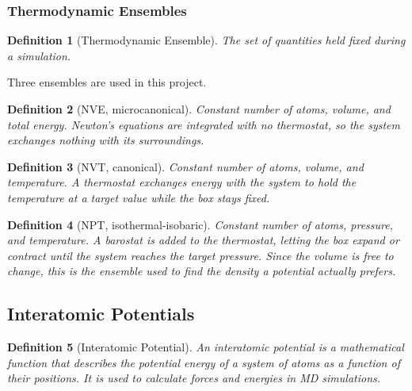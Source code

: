 \documentclass{article}
\newtheorem{definition}{Definition}
\begin{document}
\subsubsection{Thermodynamic Ensembles}
\begin{definition}[Thermodynamic Ensemble]
    The set of quantities held fixed during a simulation.
\end{definition}
Three ensembles are used in this project.
\begin{definition}[NVE, microcanonical]
    Constant number of atoms, volume, and total energy. Newton's equations are integrated with no thermostat, so the system exchanges nothing with its surroundings.
\end{definition}
\begin{definition}[NVT, canonical]
    Constant number of atoms, volume, and temperature. A thermostat exchanges energy with the system to hold the temperature at a target value while the box stays fixed.
\end{definition}
\begin{definition}[NPT, isothermal-isobaric]
    Constant number of atoms, pressure, and temperature. A barostat is added to the thermostat, letting the box expand or contract until the system reaches the target pressure. Since the volume is free to change, this is the ensemble used to find the density a potential actually prefers.
\end{definition}

\subsection{Interatomic Potentials}
\begin{definition}[Interatomic Potential]
    \label{IP}
    An interatomic potential is a mathematical function that describes the potential energy of a system of atoms as a function of their positions. It is used to calculate forces and energies in MD simulations.
\end{definition}
\end{document}
